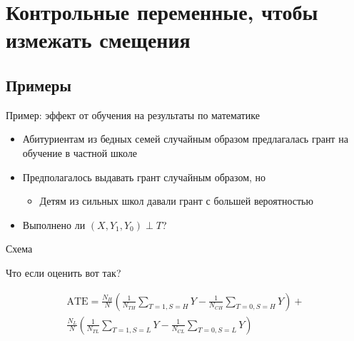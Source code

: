 
\section{Контрольные переменные, чтобы измежать смещения}


\subsection{Примеры}

\begin{frame}{Пример: эффект от обучения на результаты по математике \parencite{barnard2003principal}}
    \begin{itemize}
        \item Абитуриентам из бедных семей случайным образом предлагалась грант на обучение в частной школе
        \item Предполагалось выдавать грант случайным образом, но
        \begin{itemize}
            \item Детям из сильных школ давали грант с большей вероятностью
        \end{itemize}
        \item Выполнено ли $(X, Y_1, Y_0) \perp T$?
   \end{itemize}
\end{frame}

\begin{frame}{Схема}
\end{frame}


\begin{frame}{Что если оценить вот так?}

\begin{gather*}
\text{ATE} = \frac{N_H}{N} \left(\frac{1}{N_{TH}}\sum_{T=1, S=H} Y - \frac{1}{N_{CH}}\sum_{T=0,S=H} Y \right)+ \\
\frac{N_L}{N} \left(\frac{1}{N_{TL}}\sum_{T=1, S=L} Y - \frac{1}{N_{CL}}\sum_{T=0,S=L} Y \right)
\end{gather*}

\end{frame}


